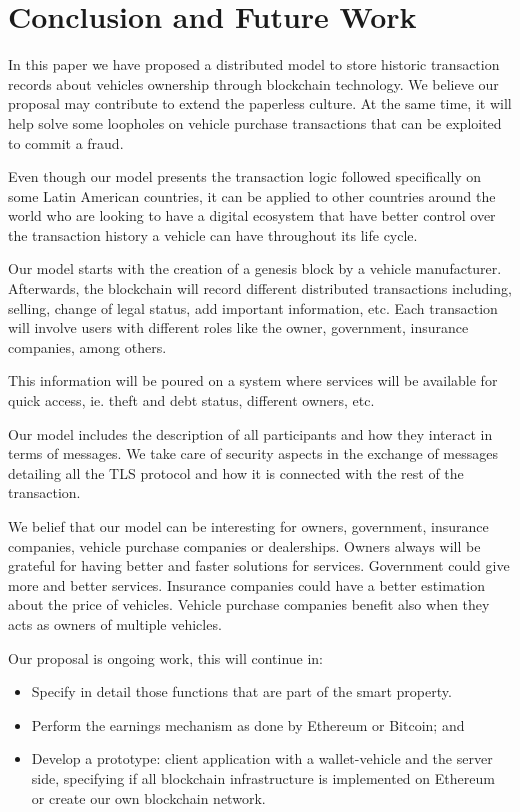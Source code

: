 
\section{Conclusion and Future Work}

In this paper we have proposed 
a distributed model to store historic transaction records about vehicles ownership 
through blockchain technology. 
We believe our proposal may contribute to extend the paperless culture.
At the same time, it will help solve some loopholes on vehicle purchase transactions
that can be exploited to commit a fraud. 

Even though our model presents the transaction logic 
followed specifically on some Latin American countries, 
it can be applied to other countries around the world 
who are looking to have a digital ecosystem 
that have better control over the transaction history a vehicle can have 
throughout its life cycle.

Our model starts with the creation of a genesis block by a vehicle manufacturer.
Afterwards, the blockchain will record different distributed transactions including, selling,
change of legal status, add important information, etc. Each transaction will involve users with different roles like the owner, government, insurance companies, among others. 

This information will be poured on a system 
where services will be available for quick access, 
ie. theft and debt status, different owners, etc.

Our model includes the description of all participants
and how they interact in terms of messages. 
We take care of security aspects in the exchange of messages 
detailing all the TLS protocol and how it
is connected with the rest of the transaction.

We belief that our model can be interesting for owners, government, insurance companies, 
vehicle purchase companies or dealerships. 
Owners always will be grateful for having better and faster solutions for services. 
Government could give more and better services. 
Insurance companies could have a better estimation about the price of vehicles. 
Vehicle purchase companies benefit also when they acts as owners of multiple vehicles.

Our proposal is ongoing work, this will continue in:
\begin{itemize}
    \item Specify in detail those functions that are part of the smart property.
    \item Perform the earnings mechanism as done by Ethereum or Bitcoin; and
    \item Develop a prototype: client application with a wallet-vehicle and the
        server side, specifying if all blockchain infrastructure is implemented on 
        Ethereum or create our own blockchain network.
\end{itemize} 






